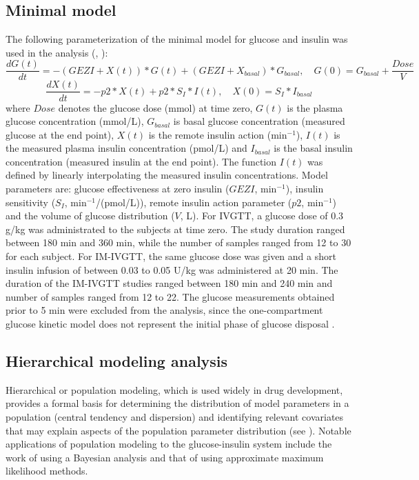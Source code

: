 \documentclass[utf8]{frontiersSCNS} %
\begin{document}
\subsection{Minimal model}
The following parameterization of the minimal model for glucose and insulin was used in the analysis (\citet{Bergman1979}, \citet{Araujo-vilar1998}):
\begin{equation}
\frac{dG(t)}{dt} =-(GEZI+X(t))*G(t)+(GEZI+X_{basal})*G_{basal}, \quad G(0) =G_{basal}+\frac{Dose}{V}\label{eq:01}
\end{equation}
\begin{equation}
\frac{dX(t)}{dt} =-p2*X(t)+p2*S_I*I(t), \quad X(0) =S_I*I_{basal}\label{eq:02}
\end{equation}
where $Dose$ denotes the glucose dose (mmol) at time zero, $G(t)$ is the plasma glucose concentration (mmol/L), $G_{basal}$ is basal glucose concentration (measured glucose at the end point), $X(t)$ is the remote insulin action (min$^{-1}$), $I(t)$ is the measured plasma insulin concentration (pmol/L) and $I_{basal}$ is the basal insulin concentration (measured insulin at the end point). The function $I(t)$ was defined by linearly interpolating the measured insulin concentrations. Model parameters are: glucose effectiveness at zero insulin ($GEZI$, min$^{-1}$), insulin sensitivity ($S_I$, min$^{-1}$/(pmol/L)), remote insulin action parameter ($p2$, min$^{-1}$) and the volume of glucose distribution ($V$, L). For IVGTT, a glucose dose of 0.3 g/kg was administrated to the subjects at time zero. The study duration ranged between 180 min and 360 min, while the number of samples ranged from 12 to 30 for each subject. For IM-IVGTT, the same glucose dose was given and a short insulin infusion of between 0.03 to 0.05 U/kg was administered at 20 min. The duration of the IM-IVGTT studies ranged between 180 min and 240 min and number of samples ranged from 12 to 22. The glucose measurements obtained prior to 5 min were excluded from the analysis, since the one-compartment glucose kinetic model does not represent the initial phase of glucose disposal \citep{Vicini1999}.

\vskip 0.75cm
\subsection{Hierarchical modeling analysis}
Hierarchical or population modeling, which is used widely in drug development, provides a formal basis for determining the distribution of model parameters in a population (central tendency and dispersion) and identifying relevant covariates that may explain aspects of the population parameter distribution (see \citet{Bonate2011}). Notable applications of population modeling to the glucose-insulin system include the work of \citet{agbaje_2003} using a Bayesian analysis and that of \citet{Denti2010} using approximate maximum likelihood methods.
\end{document}

